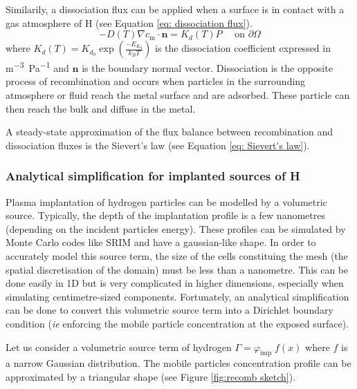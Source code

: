 Similarily, a dissociation flux can be applied when a surface is in contact with a gas atmosphere of H (see Equation \ref{eq: dissociation flux}).
\begin{equation}
    - D(T)\nabla c_\mathrm{m} \cdot \mathbf{n} = K_d(T) P \quad \text { on } \partial \Omega
    \label{eq: dissociation flux}
\end{equation}
where $K_d(T) = K_{d_0} \exp(\frac{-E_{K_d}}{k_B T}) $ is the dissociation coefficient expressed in \si{m^{-3}.Pa^{-1}} and $\mathbf{n}$ is the boundary normal vector.
Dissociation is the opposite process of recombination and occurs when particles in the surrounding atmosphere or fluid reach the metal surface and are adsorbed.
These particle can then reach the bulk and diffuse in the metal.

A steady-state approximation of the flux balance between recombination and dissociation fluxes is the Sievert's law (see Equation \ref{eq: Sievert's law}).

\subsubsection{Analytical simplification for implanted sources of H} \label{triangle model}

Plasma implantation of hydrogen particles can be modelled by a volumetric source.
Typically, the depth of the implantation profile is a few nanometres (depending on the incident particles energy).
These profiles can be simulated by Monte Carlo codes like SRIM  and have a gaussian-like shape.
In order to accurately model this source term, the size of the cells constituing the mesh (the spatial discretisation of the domain) must be less than a nanometre.
This can be done easily in 1D but is very complicated in higher dimensions, especially when simulating centimetre-sized components.
Fortunately, an analytical simplification can be done to convert this volumetric source term into a Dirichlet boundary condition (\textit{ie} enforcing the mobile particle concentration at the exposed surface).

Let us consider a volumetric source term of hydrogen $\Gamma = \varphi_\mathrm{imp} \; f(x)$ where $f$ is a narrow Gaussian distribution.
The mobile particles concentration profile can be approximated by a triangular shape  (see Figure \ref{fig:recomb sketch}).

